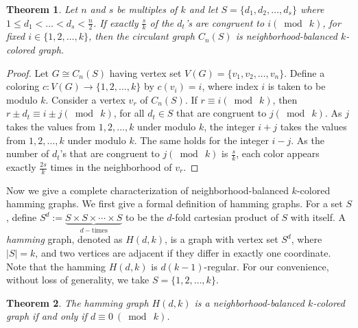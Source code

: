 \documentclass[12pt]{article}
\newtheorem{theorem}{Theorem}[section]
\newcommand{\nbcd}{neighborhood-balanced $k$-colored\xspace}
\begin{document}
\begin{theorem}
    Let $n$ and $s$ be multiples of $k$ and let $S = \{d_1, d_2, \dots, d_s\}$ where $1 \leq d_1 < \dots < d_s< \frac{n}{2}$.
    If exactly $\frac{s}{k}$ of the $d_t$'s are congruent to $i (\bmod\ k)$, for fixed $i\in \{1, 2,  \dots, k\}$, then the circulant graph $C_n(S)$ is \nbcd graph.
\end{theorem}
\begin{proof}
    Let $G \cong C_n(S)$ having vertex set $V(G)=\{v_1, v_2,  \dots, v_n\}$.
    Define a coloring $c \colon V(G) \to \{1, 2, \dots, k\}$ by $c(v_i) = i$, where index $i$ is taken to be modulo $k$.
    Consider a  vertex $v_r$ of $C_n(S)$.
    If $r \equiv i (\bmod\ k)$, then $r\pm d_t\equiv i\pm j (\bmod\ k)$, for all $d_t\in S$ that are congruent to $j (\bmod\ k)$.
    As $j$ takes the values from $1, 2, \dots, k$ under modulo $k$, the integer $i+j$ takes the values from $1, 2, \dots, k$ under modulo $k$. The same holds for the integer $i-j$. 
    As the number of $d_t$'s that are congruent to $j (\bmod\ k)$ is $\frac{s}{k}$, each color appears exactly $\frac{2s}{k}$ times in the neighborhood of $v_r$. 
\end{proof}

Now we give a complete characterization of \nbcd hamming graphs.
We first give a formal definition of hamming graphs.
For a set $S$, define $S^{d} := \underbrace{S \times S \times \cdots \times S}_{d-\mathrm{times}}$ to be the $d$-fold cartesian product of $S$ with itself.
A {\it hamming} graph, denoted as $H(d,k)$, is a graph with vertex set $S^{d}$, where $|S| = k$, and two vertices are adjacent if they differ in exactly one coordinate.
Note that the hamming $H(d,k)$ is $d(k-1)$-regular.
For our convenience, without loss of generality, we take $S = \{1,2, \dots, k\}$.

\begin{theorem} \label{th: hamming graphs}
The hamming graph $H(d,k)$ is a \nbcd graph if and only if $d\equiv 0\ (\bmod\ k)$.
\end{theorem}
\end{document}
